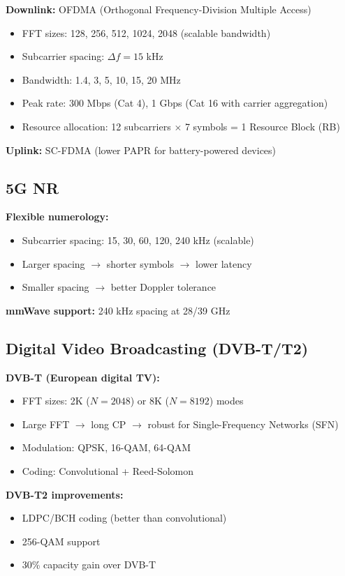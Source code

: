 \textbf{Downlink:} OFDMA (Orthogonal Frequency-Division Multiple Access)
\begin{itemize}
\item FFT sizes: 128, 256, 512, 1024, 2048 (scalable bandwidth)
\item Subcarrier spacing: $\Delta f = 15$ kHz
\item Bandwidth: 1.4, 3, 5, 10, 15, 20 MHz
\item Peak rate: 300 Mbps (Cat 4), 1 Gbps (Cat 16 with carrier aggregation)
\item Resource allocation: 12 subcarriers $\times$ 7 symbols = 1 Resource Block (RB)
\end{itemize}

\textbf{Uplink:} SC-FDMA (lower PAPR for battery-powered devices)

\subsection{5G NR}

\textbf{Flexible numerology:}
\begin{itemize}
\item Subcarrier spacing: 15, 30, 60, 120, 240 kHz (scalable)
\item Larger spacing $\rightarrow$ shorter symbols $\rightarrow$ lower latency
\item Smaller spacing $\rightarrow$ better Doppler tolerance
\end{itemize}

\textbf{mmWave support:} 240 kHz spacing at 28/39 GHz

\subsection{Digital Video Broadcasting (DVB-T/T2)}

\textbf{DVB-T (European digital TV):}
\begin{itemize}
\item FFT sizes: 2K ($N = 2048$) or 8K ($N = 8192$) modes
\item Large FFT $\rightarrow$ long CP $\rightarrow$ robust for Single-Frequency Networks (SFN)
\item Modulation: QPSK, 16-QAM, 64-QAM
\item Coding: Convolutional + Reed-Solomon
\end{itemize}

\textbf{DVB-T2 improvements:}
\begin{itemize}
\item LDPC/BCH coding (better than convolutional)
\item 256-QAM support
\item 30\% capacity gain over DVB-T
\end{itemize}


